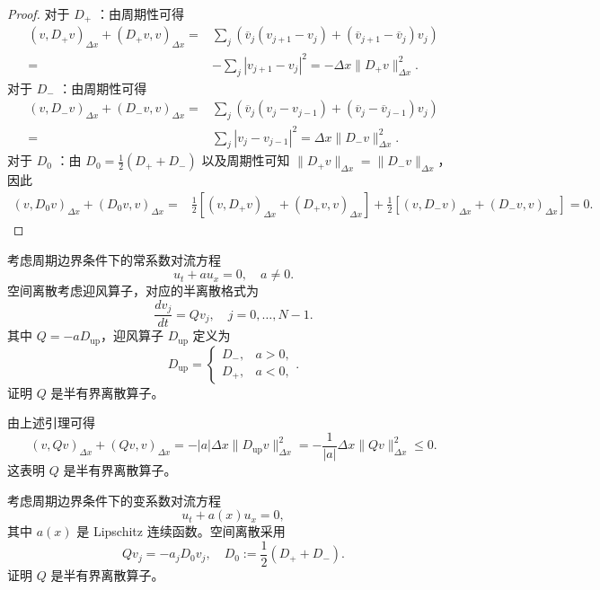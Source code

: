 \begin{proof}
    对于 $D_+$ ：由周期性可得
    \begin{align*}
        (v,D_+v)_{\Delta x} + (D_+v,v)_{\Delta x}
        ={} & \sum_{j}
        \left(\overline{v}_j(v_{j+1}-v_j) + (\overline{v}_{j+1}-\overline{v}_j)v_j\right) \\
        ={} & - \sum_{j} |v_{j+1}-v_j|^2
        = -\Delta x\|D_+v\|_{\Delta x}^2.
    \end{align*}
    对于 $D_-$ ：由周期性可得
    \begin{align*}
        (v,D_-v)_{\Delta x} + (D_-v,v)_{\Delta x}
        ={} & \sum_{j}
        \left(\overline{v}_j(v_j-v_{j-1}) + (\overline{v}_j-\overline{v}_{j-1})v_j\right) \\
        ={} & \sum_{j} |v_j-v_{j-1}|^2
        = \Delta x\|D_-v\|_{\Delta x}^2.
    \end{align*}
    对于 $D_0$ ：由 $D_0=\frac12(D_++D_-)$ 以及周期性可知
    $\|D_+v\|_{\Delta x}=\|D_-v\|_{\Delta x}$，因此
    \begin{align*}
        (v,D_0v)_{\Delta x} + (D_0v,v)_{\Delta x}
        ={} & \frac12\left[(v,D_+v)_{\Delta x}+(D_+v,v)_{\Delta x}\right] + \frac12\left[(v,D_-v)_{\Delta x}+(D_-v,v)_{\Delta x}\right]
        =0.
    \end{align*}
\end{proof}

\begin{example}
    考虑周期边界条件下的常系数对流方程
    \[
        u_t + a u_x = 0,\quad a \neq 0.
    \]
    空间离散考虑迎风算子，对应的半离散格式为
    \[
        \frac{d v_j}{dt} = Q v_j,\quad j=0,\dots,N-1.
    \]
    其中 $Q = -a D_{\mathrm{up}}$，迎风算子 $D_{\mathrm{up}}$ 定义为
    \[
        D_{\mathrm{up}} =
        \begin{cases}
            D_-, & a>0, \\
            D_+, & a<0,
        \end{cases}.
    \]
    证明 $Q$ 是半有界离散算子。
\end{example}

\begin{solution*}
    由上述引理可得
    \[
        (v,Qv)_{\Delta x} + (Qv,v)_{\Delta x}
        = -|a|\Delta x\|D_{\mathrm{up}}v\|_{\Delta x}^2 = -\frac{1}{|a|} \Delta x\|Q v\|_{\Delta x}^2\le 0.
    \]
    这表明 $Q$ 是半有界离散算子。
\end{solution*}

\begin{example}
    考虑周期边界条件下的变系数对流方程
    \[
        u_t+a(x)u_x=0,
    \]
    其中 $a(x)$ 是 Lipschitz 连续函数。空间离散采用
    \[
        Qv_j=-a_jD_0v_j,\quad D_0:=\frac12(D_++D_-).
    \]
    证明 $Q$ 是半有界离散算子。
\end{example}

